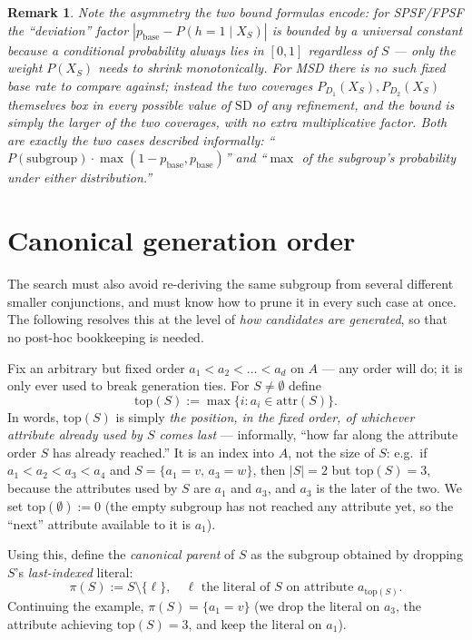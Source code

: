 \documentclass[11pt]{article}
\newtheorem{remark}{Remark}
\begin{document}
\begin{remark}
Note the asymmetry the two bound formulas encode: for SPSF/FPSF the ``deviation''
factor $|p_{\mathrm{base}}-P(h=1\mid X_S)|$ is bounded by a \emph{universal} constant
because a conditional probability always lies in $[0,1]$ regardless of $S$ — only the
\emph{weight} $P(X_S)$ needs to shrink monotonically. For MSD there is no such fixed
base rate to compare against; instead the two coverages $P_{D_1}(X_S),P_{D_2}(X_S)$
themselves box in every possible value of $\mathrm{SD}$ of any refinement, and the
bound is simply the larger of the two coverages, with no extra multiplicative factor.
Both are exactly the two cases described informally: ``$P(\text{subgroup})\cdot
\max(1-p_{\mathrm{base}},p_{\mathrm{base}})$'' and ``$\max$ of the subgroup's
probability under either distribution.''
\end{remark}

\section{Canonical generation order}

The search must also avoid re-deriving the same subgroup from several different
smaller conjunctions, and must know how to prune it in every such case at once. The
following resolves this at the level of \emph{how candidates are generated}, so that
no post-hoc bookkeeping is needed.

Fix an arbitrary but fixed order $a_1<a_2<\dots<a_d$ on $A$ — any order will do; it is
only ever used to break generation ties. For $S\neq\emptyset$ define
\[
\mathrm{top}(S):=\max\{i : a_i\in\mathrm{attr}(S)\}.
\]
In words, $\mathrm{top}(S)$ is simply \emph{the position, in the fixed order, of
whichever attribute already used by $S$ comes last} — informally, ``how far along the
attribute order $S$ has already reached.'' It is an index into $A$, not the size of
$S$: e.g.\ if $a_1<a_2<a_3<a_4$ and $S=\{a_1\!=\!v,\,a_3\!=\!w\}$, then $|S|=2$ but
$\mathrm{top}(S)=3$, because the attributes used by $S$ are $a_1$ and $a_3$, and $a_3$
is the later of the two. We set $\mathrm{top}(\emptyset):=0$ (the empty subgroup has
not reached any attribute yet, so the ``next'' attribute available to it is $a_1$).

Using this, define the \emph{canonical parent} of $S$ as the subgroup obtained by
dropping $S$'s \emph{last-indexed} literal:
\[
\pi(S):=S\setminus\{\ell\},\quad \ell \text{ the literal of $S$ on attribute } a_{\mathrm{top}(S)} .
\]
Continuing the example, $\pi(S)=\{a_1\!=\!v\}$ (we drop the literal on $a_3$, the
attribute achieving $\mathrm{top}(S)=3$, and keep the literal on $a_1$).
\end{document}
